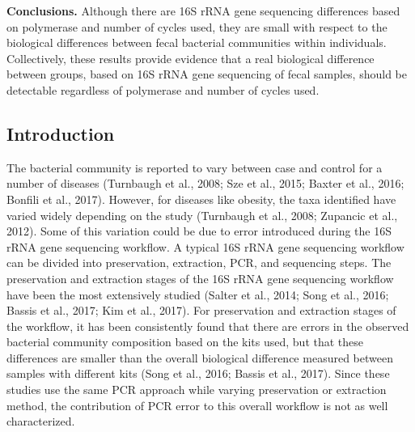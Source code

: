 \documentclass[11pt,]{article}
\begin{document}
\textbf{Conclusions.} Although there are 16S rRNA gene sequencing
differences based on polymerase and number of cycles used, they are
small with respect to the biological differences between fecal bacterial
communities within individuals. Collectively, these results provide
evidence that a real biological difference between groups, based on 16S
rRNA gene sequencing of fecal samples, should be detectable regardless
of polymerase and number of cycles used.

\newpage

\subsection{Introduction}\label{introduction}

The bacterial community is reported to vary between case and control for
a number of diseases (Turnbaugh et al., 2008; Sze et al., 2015; Baxter
et al., 2016; Bonfili et al., 2017). However, for diseases like obesity,
the taxa identified have varied widely depending on the study (Turnbaugh
et al., 2008; Zupancic et al., 2012). Some of this variation could be
due to error introduced during the 16S rRNA gene sequencing workflow. A
typical 16S rRNA gene sequencing workflow can be divided into
preservation, extraction, PCR, and sequencing steps. The preservation
and extraction stages of the 16S rRNA gene sequencing workflow have been
the most extensively studied (Salter et al., 2014; Song et al., 2016;
Bassis et al., 2017; Kim et al., 2017). For preservation and extraction
stages of the workflow, it has been consistently found that there are
errors in the observed bacterial community composition based on the kits
used, but that these differences are smaller than the overall biological
difference measured between samples with different kits (Song et al.,
2016; Bassis et al., 2017). Since these studies use the same PCR
approach while varying preservation or extraction method, the
contribution of PCR error to this overall workflow is not as well
characterized.
\end{document}
